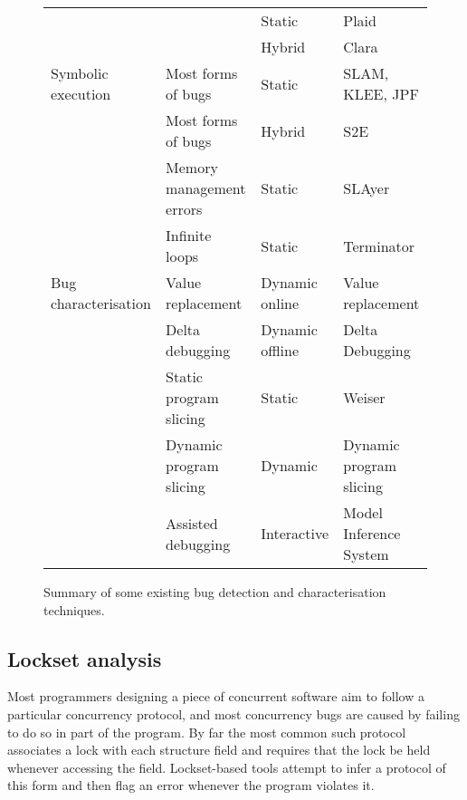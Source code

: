 \begin{sidewaysfigure}
\begin{figgure}
\begin{tabular}{l>{\RaggedRight\arraybackslash}p{5.5cm}lp{10.3cm}}
                               &                                                                             & Static  & Plaid\cite{Sunshine2011}\\
                               &                                                                             & Hybrid  & Clara\cite{Bodden2010}\\
    \hdashline
    Symbolic execution         & Most forms of bugs                           & Static          & SLAM\cite{Ball2011}, KLEE\cite{Cadar}, JPF\cite{Havelund2000} \\
                               & Most forms of bugs                           & Hybrid          & S2E\cite{Chipounov2011} \\
                               & Memory management errors                     & Static          & SLAyer\cite{Berdine2011} \\
                               & Infinite loops                               & Static          & Terminator\cite{Cook2006a} \\
    \hline
    Bug characterisation       & Value replacement                            & Dynamic online  & Value replacement\cite{Jeffrey2009} \\
                               & Delta debugging                              & Dynamic offline & Delta Debugging\cite{Cleve2005,Choi2002} \\
                               & Static program slicing                       & Static          & Weiser\cite{Weiser1981} \\
                               & Dynamic program slicing                      & Dynamic         & Dynamic program slicing\cite{Agrawal1990a} \\
                               & Assisted debugging                           & Interactive     & Model Inference System\cite{Shapiro1982} \\
  \end{tabular}
  \caption{Summary of some existing bug detection and characterisation
    techniques.}
  \label{fig:rw:find_char}
  \end{figgure}
\end{sidewaysfigure}

\subsection{Lockset analysis}

Most programmers designing a piece of concurrent software aim to
follow a particular concurrency protocol, and most concurrency bugs
are caused by failing to do so in part of the program.  By far the
most common such protocol associates a lock with each structure field
and requires that the lock be held whenever accessing the field.
Lockset-based tools attempt to infer a protocol of this form and then
flag an error whenever the program violates it.

